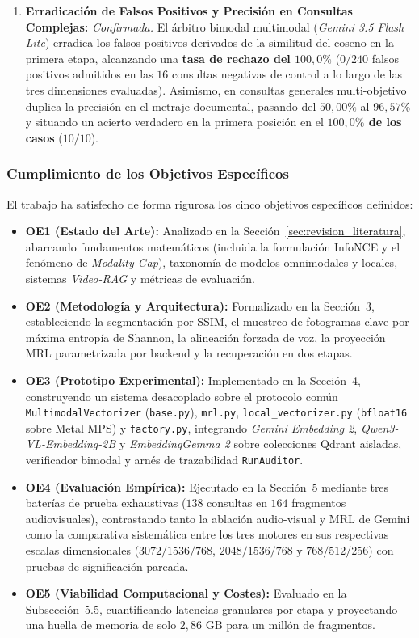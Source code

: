 \begin{enumerate}[label=\textbf{Hipótesis \arabic* ($H_\arabic*$):}, wide=0pt, leftmargin=*]
    \item \textbf{Erradicación de Falsos Positivos y Precisión en Consultas Complejas:}
    \textit{Confirmada.} El árbitro bimodal multimodal (\textit{Gemini 3.5 Flash Lite}) erradica los falsos positivos derivados de la similitud del coseno en la primera etapa, alcanzando una \textbf{tasa de rechazo del $100,0\%$} ($0/240$ falsos positivos admitidos en las $16$ consultas negativas de control a lo largo de las tres dimensiones evaluadas). Asimismo, en consultas generales multi-objetivo duplica la precisión en el metraje documental, pasando del $50,00\%$ al \textbf{$96,57\%$} y situando un acierto verdadero en la primera posición en el \textbf{$100,0\%$ de los casos} ($10/10$).
\end{enumerate}

\subsubsection{Cumplimiento de los Objetivos Específicos}
El trabajo ha satisfecho de forma rigurosa los cinco objetivos específicos definidos:
\begin{itemize}
    \item \textbf{OE1 (Estado del Arte):} Analizado en la Sección~\ref{sec:revision_literatura}, abarcando fundamentos matemáticos (incluida la formulación InfoNCE y el fenómeno de \textit{Modality Gap}), taxonomía de modelos omnimodales y locales, sistemas \textit{Video-RAG} y métricas de evaluación.
    \item \textbf{OE2 (Metodología y Arquitectura):} Formalizado en la Sección~3, estableciendo la segmentación por SSIM, el muestreo de fotogramas clave por máxima entropía de Shannon, la alineación forzada de voz, la proyección MRL parametrizada por backend y la recuperación en dos etapas.
    \item \textbf{OE3 (Prototipo Experimental):} Implementado en la Sección~4, construyendo un sistema desacoplado sobre el protocolo común \texttt{MultimodalVectorizer} (\texttt{base.py}), \texttt{mrl.py}, \texttt{local\_vectorizer.py} (\texttt{bfloat16} sobre Metal MPS) y \texttt{factory.py}, integrando \textit{Gemini Embedding 2}, \textit{Qwen3-VL-Embedding-2B} y \textit{EmbeddingGemma 2} sobre colecciones Qdrant aisladas, verificador bimodal y arnés de trazabilidad \texttt{RunAuditor}.
    \item \textbf{OE4 (Evaluación Empírica):} Ejecutado en la Sección~5 mediante tres baterías de prueba exhaustivas ($138$ consultas en $164$ fragmentos audiovisuales), contrastando tanto la ablación audio-visual y MRL de Gemini como la comparativa sistemática entre los tres motores en sus respectivas escalas dimensionales ($3072/1536/768$, $2048/1536/768$ y $768/512/256$) con pruebas de significación pareada.
    \item \textbf{OE5 (Viabilidad Computacional y Costes):} Evaluado en la Subsección~5.5, cuantificando latencias granulares por etapa y proyectando una huella de memoria de solo $2,86\text{ GB}$ para un millón de fragmentos.
\end{itemize}
